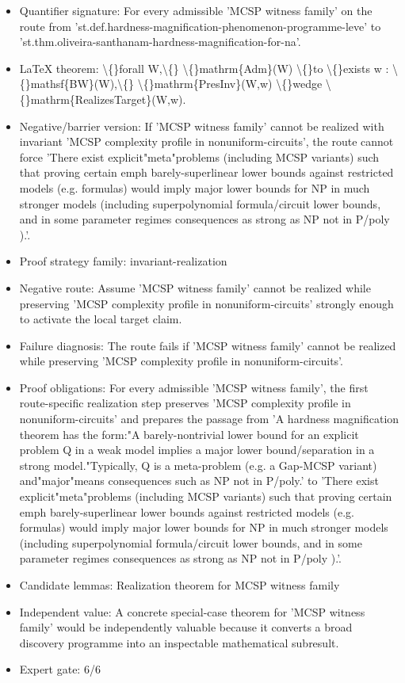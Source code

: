 \documentclass[11pt]{article}
\begin{document}
\begin{itemize}
\item Quantifier signature: For every admissible 'MCSP witness family' on the route from 'st.def.hardness-magnification-phenomenon-programme-leve' to 'st.thm.oliveira-santhanam-hardness-magnification-for-na'.
\item LaTeX theorem: \textbackslash\{\}forall W,\textbackslash\{\} \textbackslash\{\}mathrm\{Adm\}(W) \textbackslash\{\}to \textbackslash\{\}exists w : \textbackslash\{\}mathsf\{BW\}(W),\textbackslash\{\} \textbackslash\{\}mathrm\{PresInv\}(W,w) \textbackslash\{\}wedge \textbackslash\{\}mathrm\{RealizesTarget\}(W,w).
\item Negative/barrier version: If 'MCSP witness family' cannot be realized with invariant 'MCSP complexity profile in nonuniform-circuits', the route cannot force 'There exist explicit"meta"problems (including MCSP variants) such that proving certain emph barely-superlinear lower bounds against restricted models (e.g. formulas) would imply major lower bounds for NP in much stronger models (including superpolynomial formula/circuit lower bounds, and in some parameter regimes consequences as strong as NP not in P/poly ).'.
\item Proof strategy family: invariant-realization
\item Negative route: Assume 'MCSP witness family' cannot be realized while preserving 'MCSP complexity profile in nonuniform-circuits' strongly enough to activate the local target claim.
\item Failure diagnosis: The route fails if 'MCSP witness family' cannot be realized while preserving 'MCSP complexity profile in nonuniform-circuits'.
\item Proof obligations: For every admissible 'MCSP witness family', the first route-specific realization step preserves 'MCSP complexity profile in nonuniform-circuits' and prepares the passage from 'A hardness magnification theorem has the form:"A barely-nontrivial lower bound for an explicit problem Q in a weak model implies a major lower bound/separation in a strong model."Typically, Q is a meta-problem (e.g. a Gap-MCSP variant) and"major"means consequences such as NP not in P/poly.' to 'There exist explicit"meta"problems (including MCSP variants) such that proving certain emph barely-superlinear lower bounds against restricted models (e.g. formulas) would imply major lower bounds for NP in much stronger models (including superpolynomial formula/circuit lower bounds, and in some parameter regimes consequences as strong as NP not in P/poly ).'.
\item Candidate lemmas: Realization theorem for MCSP witness family
\item Independent value: A concrete special-case theorem for 'MCSP witness family' would be independently valuable because it converts a broad discovery programme into an inspectable mathematical subresult.
\item Expert gate: 6/6
\end{itemize}
\end{document}
